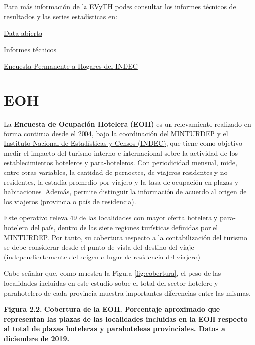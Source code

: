 \documentclass[
  openany]{book}
\begin{document}
Para más información de la EVyTH podes consultar los informes técnicos de resultados y las series estadísticas en:

\href{http://datos.yvera.gob.ar/dataset/encuesta-viajes-turismo-hogares-evyth}{Data abierta}

\href{https://www.yvera.tur.ar/estadistica/info/encuesta-de-viajes-y-turismo-de-los-hogares-evyth}{Informes técnicos}

\href{https://www.indec.gob.ar/indec/web/Institucional-Indec-OperacionesEstadisticas}{Encuesta Permanente a Hogares del INDEC}

\hypertarget{eoh}{%
\section{EOH}\label{eoh}}

La \textbf{Encuesta de Ocupación Hotelera (EOH)} es un relevamiento realizado en forma continua desde el 2004, bajo la \href{https://www.indec.gob.ar/indec/web/Nivel4-Tema-3-13-56}{coordinación del MINTURDEP y el Instituto Nacional de Estadísticas y Censos (INDEC)}, que tiene como objetivo medir el impacto del turismo interno e internacional sobre la actividad de los establecimientos hoteleros y para-hoteleros.
Con periodicidad mensual, mide, entre otras variables, la cantidad de pernoctes, de viajeros residentes y no residentes, la estadía promedio por viajero y la tasa de ocupación en plazas y habitaciones.
Además, permite distinguir la información de acuerdo al origen de los viajeros (provincia o país de residencia).

Este operativo releva 49 de las localidades con mayor oferta hotelera y para-hotelera del país, dentro de las siete regiones turísticas definidas por el MINTURDEP.
Por tanto, su cobertura respecto a la contabilización del turismo se debe considerar desde el punto de vista del destino del viaje (independientemente del origen o lugar de residencia del viajero).

Cabe señalar que, como muestra la Figura \ref{fig:cobertura}, el peso de las localidades incluidas en este estudio sobre el total del sector hotelero y parahotelero de cada provincia muestra importantes diferencias entre las mismas.

\textbf{Figura 2.2. Cobertura de la EOH. Porcentaje aproximado que representan las plazas de las localidades incluidas en la EOH respecto al total de plazas hoteleras y parahoteleas provinciales. Datos a diciembre de 2019.}
\end{document}
